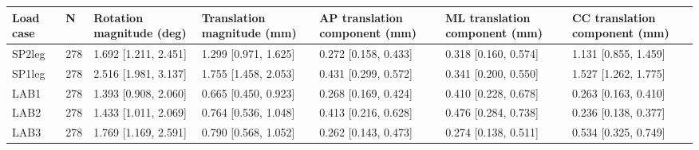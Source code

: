 \begin{tabular}{lllllll}
\toprule
Load case & N & Rotation magnitude (deg) & Translation magnitude (mm) & AP translation component (mm) & ML translation component (mm) & CC translation component (mm) \\
\midrule
SP2leg & 278 & 1.692 [1.211, 2.451] & 1.299 [0.971, 1.625] & 0.272 [0.158, 0.433] & 0.318 [0.160, 0.574] & 1.131 [0.855, 1.459] \\
SP1leg & 278 & 2.516 [1.981, 3.137] & 1.755 [1.458, 2.053] & 0.431 [0.299, 0.572] & 0.341 [0.200, 0.550] & 1.527 [1.262, 1.775] \\
LAB1 & 278 & 1.393 [0.908, 2.060] & 0.665 [0.450, 0.923] & 0.268 [0.169, 0.424] & 0.410 [0.228, 0.678] & 0.263 [0.163, 0.410] \\
LAB2 & 278 & 1.433 [1.011, 2.069] & 0.764 [0.536, 1.048] & 0.413 [0.216, 0.628] & 0.476 [0.284, 0.738] & 0.236 [0.138, 0.377] \\
LAB3 & 278 & 1.769 [1.169, 2.591] & 0.790 [0.568, 1.052] & 0.262 [0.143, 0.473] & 0.274 [0.138, 0.511] & 0.534 [0.325, 0.749] \\
\bottomrule
\end{tabular}
